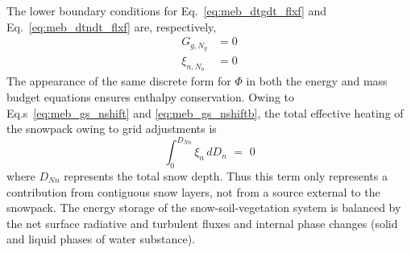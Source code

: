 {The lower boundary conditions for 
Eq.~\ref{eq:meb_dtgdt_flxf} and Eq.~\ref{eq:meb_dtndt_flxf} 
are, respectively,
%
\begin{align}
\label{eq:meb_gb_cvdtvdt_eq}
%
G_{g,N_g} &= 0
%
\\
\label{eq:meb_gs_nshiftb}
\xi_{n,N_n} &= 0
%
\end{align}
%
%
%
%
The appearance of the same discrete form for $\Phi$ in both the energy and
mass budget equations ensures enthalpy conservation.
%
%
Owing to Eq.s~\ref{eq:meb_gs_nshift} and \ref{eq:meb_gs_nshiftb},
the total effective heating of the snowpack owing to grid adjustments is
%
\begin{equation}
  \label{eq:meb_snow_heat_intern_int}
\int_{0}^{D_{Nn}} \xi_n \,dD_n \,\,=\,\, 0
%
\end{equation}
%
where $D_{Nn}$ represents the total snow depth.
Thus this term only represents a contribution from contiguous snow
layers, not from a source external to the snowpack.
The energy storage of the snow-soil-vegetation
system is balanced by the net surface radiative and turbulent fluxes and internal phase changes
(solid and liquid phases of water substance). 




}
